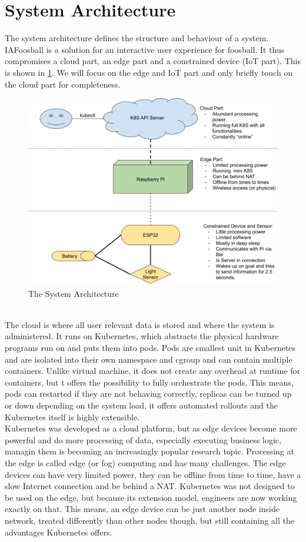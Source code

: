 \section{System Architecture}
The system architecture defines the structure and behaviour of a system. IAFoosball is a solution for an interactive user experience for foosball. It thus compromises a cloud part, an edge part and a constrained device (IoT part). This is shown in \cref{fig:systemArch}. We will focus on the edge and IoT part and only briefly touch on the cloud part for completeness. 
\begin{figure}[h!]
    \centering
    \includegraphics[scale=0.3]{figures/system-arch.png}%
    \caption{The System Architecture}\label{fig:systemArch}
\end{figure}\\
The cloud is where all user relevant data is stored and where the system is administered. It runs on Kubernetes, which abstracts the physical hardware programs run on and puts them into pods. Pods are smallest unit in Kubernetes and are isolated into their own namespace and cgroup and can contain multiple containers. Unlike virtual machine, it does not create any overhead at runtime for containers, but t offers the possibility to fully orchestrate the pods. This means, pods can restarted if they are not behaving correctly, replicas can be turned up or down depending on the system load, it offers automated rollouts and the Kubernetes itself is highly extensible.\\
Kubernetes was developed as a cloud platform, but as edge devices become more powerful and do more processing of data, especially executing business logic, managin them is becoming an increasingly popular research topic. Processing at the edge is called edge (or fog) computing and has many challenges. The edge devices can have very limited power, they can be offline from time to time, have a slow Internet connection and be behind a NAT. Kubernetes was not designed to be used on the edge, but because its extension model, engineers are now working exactly on that. This means, an edge device can be just another node inside network, treated differently than other nodes though, but still containing all the advantages Kubernetes offers.\\
